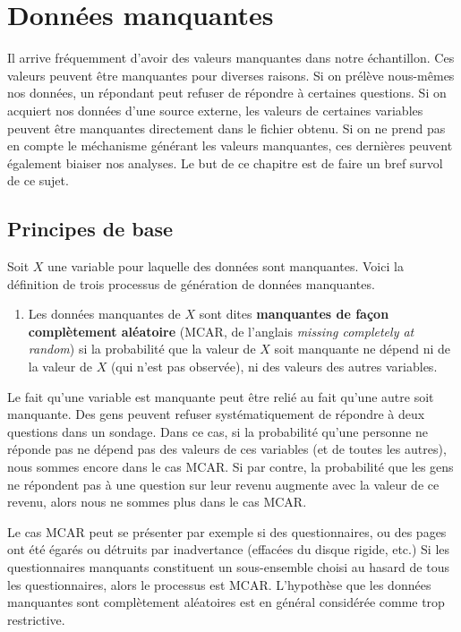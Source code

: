 \documentclass[
  11pt,
  letterpaper,
]{book}
\providecommand{\tightlist}{%
  \setlength{\itemsep}{0pt}\setlength{\parskip}{0pt}}\usepackage{longtable,booktabs,array}
\theoremstyle{definition}
\theoremstyle{remark}
\begin{document}

\hypertarget{donnees-manquantes}{%
\chapter{Données manquantes}\label{donnees-manquantes}}

Il arrive fréquemment d'avoir des valeurs manquantes dans notre
échantillon. Ces valeurs peuvent être manquantes pour diverses raisons.
Si on prélève nous-mêmes nos données, un répondant peut refuser de
répondre à certaines questions. Si on acquiert nos données d'une source
externe, les valeurs de certaines variables peuvent être manquantes
directement dans le fichier obtenu. Si on ne prend pas en compte le
méchanisme générant les valeurs manquantes, ces dernières peuvent
également biaiser nos analyses. Le but de ce chapitre est de faire un
bref survol de ce sujet.

\hypertarget{principes-de-base}{%
\section{Principes de base}\label{principes-de-base}}

Soit \(X\) une variable pour laquelle des données sont manquantes. Voici
la définition de trois processus de génération de données manquantes.

\begin{enumerate}
\def\labelenumi{\arabic{enumi})}
\tightlist
\item
  Les données manquantes de \(X\) sont dites \textbf{manquantes de façon
  complètement aléatoire} (MCAR, de l'anglais \emph{missing completely
  at random}) si la probabilité que la valeur de \(X\) soit manquante ne
  dépend ni de la valeur de \(X\) (qui n'est pas observée), ni des
  valeurs des autres variables.
\end{enumerate}

Le fait qu'une variable est manquante peut être relié au fait qu'une
autre soit manquante. Des gens peuvent refuser systématiquement de
répondre à deux questions dans un sondage. Dans ce cas, si la
probabilité qu'une personne ne réponde pas ne dépend pas des valeurs de
ces variables (et de toutes les autres), nous sommes encore dans le cas
MCAR. Si par contre, la probabilité que les gens ne répondent pas à une
question sur leur revenu augmente avec la valeur de ce revenu, alors
nous ne sommes plus dans le cas MCAR.

Le cas MCAR peut se présenter par exemple si des questionnaires, ou des
pages ont été égarés ou détruits par inadvertance (effacées du disque
rigide, etc.) Si les questionnaires manquants constituent un
sous-ensemble choisi au hasard de tous les questionnaires, alors le
processus est MCAR. L'hypothèse que les données manquantes sont
complètement aléatoires est en général considérée comme trop
restrictive.
\end{document}

